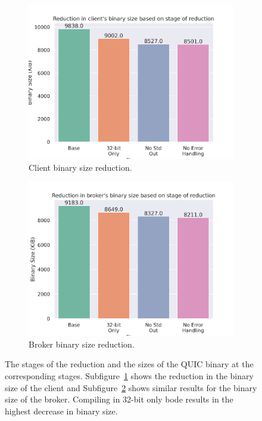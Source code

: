 \begin{figure}
    \begin{center}
        \begin{subfigure}[b]{1\textwidth}
            \includegraphics[width=1\linewidth]{images/quinn_binary_reduce_client.png}
            \caption{Client binary size reduction.}
            \label{fig:reduce_client}
        \end{subfigure}
        \begin{subfigure}[b]{1\textwidth}
            \includegraphics[width=1\linewidth]{images/quinn_binary_reduce_broker.png}
            \caption{Broker binary size reduction.}
            \label{fig:reduce_roker}
        \end{subfigure}
        \caption{The stages of the reduction and the sizes of the QUIC binary at the corresponding stages. Subfigure~\ref{fig:reduce_client} shows the reduction in the binary size of the client and Subfigure~\ref{fig:reduce_roker} shows similar results for the binary size of the broker.
        Compiling in 32-bit only bode results in the highest decrease in binary size.}
        \label{fig:reduce}
    \end{center}
\end{figure}

